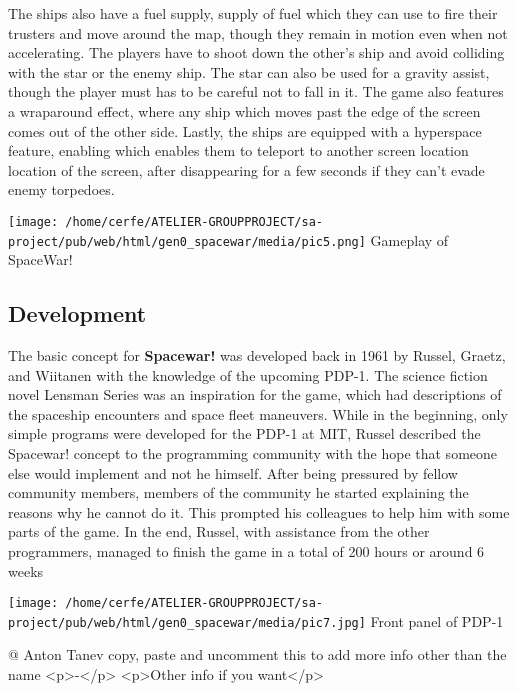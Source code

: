 \documentclass[a4paper,10pt]{book}
\begin{document}
 
 
        The ships also have a fuel supply, supply of fuel  which they can use to fire their trusters and move around the map, though they remain
        in motion even when not accelerating. The players have to shoot down the other's ship and avoid colliding with the star or
        the enemy ship. The star can also be used for a gravity assist, though the player must  has to  be careful not to fall in it. The game
        also features a wraparound effect, where any ship which moves past the edge of the screen comes out of the other side. Lastly,
        the ships are equipped with a hyperspace feature, enabling  which enables  them to teleport to another screen location  location of the screen,  after
        disappearing for a few seconds if they can't evade enemy torpedoes.
         
 
 
 \texttt{[image: /home/cerfe/ATELIER-GROUPPROJECT/sa-project/pub/web/html/gen0\_spacewar/media/pic5.png]}
 Gameplay of SpaceWar! 
 
 
 \subsection{Development }
 
        The basic concept for  \textbf{Spacewar! }  was developed back in 1961 by Russel, Graetz, and Wiitanen with the knowledge of the upcoming PDP-1.
        The science fiction novel Lensman Series was an inspiration for the game, which had descriptions of the spaceship encounters and
        space fleet maneuvers. While in the beginning, only simple programs were developed for the PDP-1 at MIT, Russel described the
        Spacewar! concept to the programming community with the hope that someone else would implement and not he himself. After being
        pressured by fellow community members,  members of the community  he started explaining  the reasons  why he cannot do it. This prompted his colleagues
        to help him with some parts of the game. In the end, Russel, with assistance from the other programmers, managed to finish the game
        in a total of 200 hours or around 6 weeks
         
 
 
 \texttt{[image: /home/cerfe/ATELIER-GROUPPROJECT/sa-project/pub/web/html/gen0\_spacewar/media/pic7.jpg]}
 Front panel of PDP-1 
 
 
 
 @ Anton Tanev 
  copy, paste and uncomment this to add more info other than the name
            <p>-</p>
            <p>Other info if you want</p>
           
\end{document}
